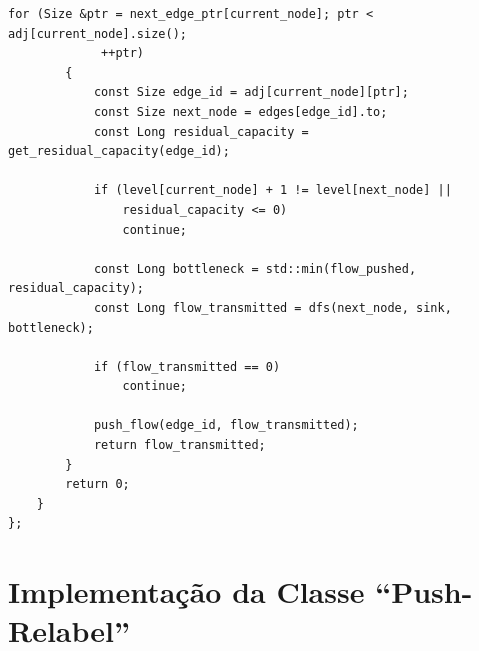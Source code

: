 \documentclass[12pt,a4paper]{article}
\begin{document}
\begin{lstlisting}[caption={Implementação em C++ da classe \lstinline{Dinic}, estruturada com Digrafo de Níveis e otimização de ponteiros mortos no cálculo do fluxo bloqueador.}, label={lst:dinic}]
		for (Size &ptr = next_edge_ptr[current_node]; ptr < adj[current_node].size();
		     ++ptr)
		{
			const Size edge_id = adj[current_node][ptr];
			const Size next_node = edges[edge_id].to;
			const Long residual_capacity = get_residual_capacity(edge_id);

			if (level[current_node] + 1 != level[next_node] ||
			    residual_capacity <= 0)
				continue;

			const Long bottleneck = std::min(flow_pushed, residual_capacity);
			const Long flow_transmitted = dfs(next_node, sink, bottleneck);

			if (flow_transmitted == 0)
				continue;

			push_flow(edge_id, flow_transmitted);
			return flow_transmitted;
		}
		return 0;
	}
};
\end{lstlisting}

\newpage
\section{Implementação da Classe ``Push-Relabel''}
\label{ap:push_relabel}
\end{document}
